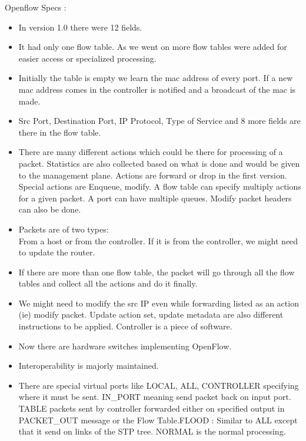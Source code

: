 \documentclass[solution,addpoints,12pt]{exam}
\begin{document}
Openflow Specs :\\
\begin{itemize}
\item In version 1.0 there were 12 fields.
\item It had only one flow table. As we went on more
flow tables were added for easier access or specialized
processing.
\item Initially the table is empty we learn the mac address
of every port. If a new mac address comes in the controller
is notified and a broadcast of the mac is made.
\item Src Port, Destination Port, IP Protocol, Type of Service
and 8 more fields are there in the flow table.
\item There are many different actions which could be there
for processing of a packet. Statistics are also collected based on what
is done and would be given to the management plane.
Actions are forward or drop in the first version.
Special actions are Enqueue, modify. A flow table can
specify multiply actions for a given packet. A port
can have multiple queues. Modify packet headers can also be
done.
\item Packets are of two types:\\
From a host or from the controller. If it is from the controller,
we might need to update the router.
\item If there are more than one flow table, the packet
will go through all the flow tables and collect all the actions
and do it finally.
\item We might need to modify the src IP even while forwarding
listed as an action (ie) modify packet. Update action
set, update metadata are also different instructions to be
applied. Controller is a piece of software.
\item Now there are hardware switches implementing OpenFlow.
\item Interoperability is majorly maintained.
\item There are special virtual ports like LOCAL, ALL, CONTROLLER
specifying where it must be sent. IN_PORT meaning send packet
back on input port. TABLE packets sent by controller
forwarded either on specified output in PACKET_OUT message or the
Flow Table.FLOOD : Similar to ALL except that it send on links of
the STP tree. NORMAL is the normal processing.
\end{itemize}
\end{document}

